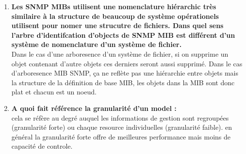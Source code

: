 \documentclass[12pt,landscape]{article}
\begin{document}
\begin{multicols}{2}
\begin{enumerate}
\item \textbf{Les SNMP MIBs utilisent une nomenclature hiérarchic très similaire à la structure de beaucoup de système opérationels utilisent pour nomer une strucutre de fichiers. Dans quel sens l'arbre d'identifcation d'objects de SNMP MIB est différent d'un système de nomenclature d'un système de fichier.}\\
Dans le cas d'une arboresence d'un système de fichier, si on supprime un objet contenant d'autre objets ces derniers seront aussi supprimé.
Dans le cas d'arboresence MIB SNMP, ça ne reflète pas une hiérarchie entre objets mais la structure de la définition de base MIB, les objets dans la MIB sont donc plat et chacun est un noeud.

\item \textbf{A quoi fait référence la granularité d'un model :}\\
cela se réfère au degré auquel les informations de gestion sont regroupées (granularité forte) ou chaque resource individuelles (granularité faible). en général la granularité forte offre de meilleures performance mais moins de capacité de controle.

\end{enumerate}




\end{multicols}
\end{document}
